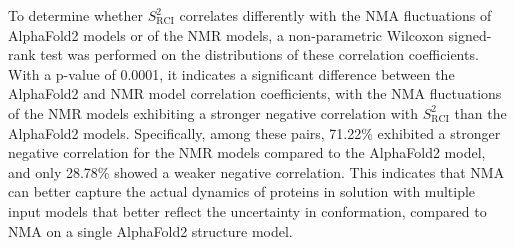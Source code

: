 To determine whether $S^2_{\text{RCI}}$ correlates differently with the NMA fluctuations of AlphaFold2 models or of the NMR models, a non-parametric Wilcoxon signed-rank test was performed on the distributions of these correlation coefficients.
With a p-value of 0.0001, it indicates a significant difference between the AlphaFold2 and NMR model correlation coefficients, with the NMA fluctuations of the NMR models exhibiting a stronger negative correlation with $S^2_{\text{RCI}}$ than the AlphaFold2 models. Specifically, among these pairs, 71.22\% exhibited a stronger negative correlation for the NMR models compared to the AlphaFold2 model, and only 28.78\% showed a weaker negative correlation. This indicates that NMA can better capture the actual dynamics of proteins in solution with multiple input models that better reflect the uncertainty in conformation, compared to NMA on a single AlphaFold2 structure model.





